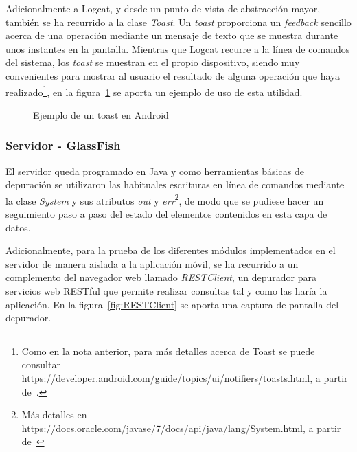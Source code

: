 Adicionalmente a Logcat, y desde un punto de vista de abstracción mayor, también se ha recurrido a la clase \emph{Toast}. Un \emph{toast} proporciona un \textit{feedback} sencillo acerca de una operación mediante un mensaje de texto que se muestra durante unos instantes en la pantalla. Mientras que Logcat recurre a la línea de comandos del sistema, los \emph{toast} se muestran en el propio dispositivo, siendo muy convenientes para mostrar al usuario el resultado de alguna operación que haya realizado\footnote{Como en la nota anterior, para más detalles acerca de Toast se puede consultar \url{https://developer.android.com/guide/topics/ui/notifiers/toasts.html}, a partir de~\cite{AnDev}.}, en la figura~\ref{fig:ejemploToast} se aporta un ejemplo de uso de esta utilidad.

\begin{figure}
	\centering
	\caption{Ejemplo de un toast en Android}
	\label{fig:ejemploToast}
\end{figure}

\subsubsection{Servidor - GlassFish}

El servidor queda programado en Java y como herramientas básicas de depuración se utilizaron las habituales escrituras en línea de comandos mediante la clase \emph{System} y sus atributos \emph{out} y \emph{err}\footnote{Más detalles en \url{https://docs.oracle.com/javase/7/docs/api/java/lang/System.html}, a partir de~\cite{DocOr}}, de modo que se pudiese hacer un seguimiento paso a paso del estado del elementos contenidos en esta capa de datos.

Adicionalmente, para la prueba de los diferentes módulos implementados en el servidor de manera aislada a la aplicación móvil, se ha recurrido a un complemento del navegador web llamado \emph{RESTClient}, un depurador para servicios web RESTful que permite realizar consultas tal y como las haría la aplicación. En la figura~\ref{fig:RESTClient} se aporta una captura de pantalla del depurador.

